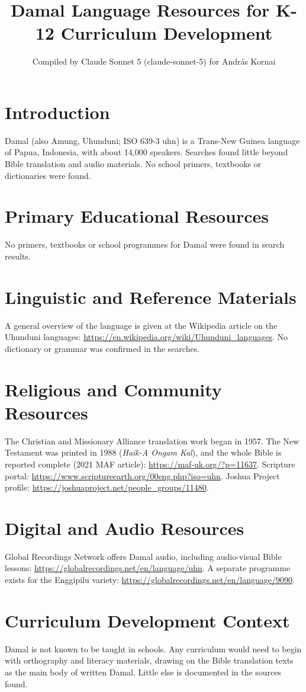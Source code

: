 \documentclass[12pt]{article}
\title{Damal Language Resources for K-12 Curriculum Development}
\author{Compiled by Claude Sonnet 5 (claude-sonnet-5) for Andr\'as Kornai}
\date{}
\begin{document}
\maketitle

\section{Introduction}
Damal (also Amung, Uhunduni; ISO 639-3 uhn) is a Trans-New Guinea language of Papua, Indonesia, with about 14,000 speakers. Searches found little beyond Bible translation and audio materials. No school primers, textbooks or dictionaries were found.

\section{Primary Educational Resources}
No primers, textbooks or school programmes for Damal were found in search results.

\section{Linguistic and Reference Materials}
A general overview of the language is given at the Wikipedia article on the Uhunduni languages: \url{https://en.wikipedia.org/wiki/Uhunduni_languages}. No dictionary or grammar was confirmed in the searches.

\section{Religious and Community Resources}
The Christian and Missionary Alliance translation work began in 1957. The New Testament was printed in 1988 (\emph{Haik-A Ongam Kal}), and the whole Bible is reported complete (2021 MAF article): \url{https://maf-uk.org/?p=11637}. Scripture portal: \url{https://www.scriptureearth.org/00eng.php?iso=uhn}. Joshua Project profile: \url{https://joshuaproject.net/people_groups/11480}.

\section{Digital and Audio Resources}
Global Recordings Network offers Damal audio, including audio-visual Bible lessons: \url{https://globalrecordings.net/en/language/uhn}. A separate programme exists for the Enggipilu variety: \url{https://globalrecordings.net/en/language/9090}.

\section{Curriculum Development Context}
Damal is not known to be taught in schools. Any curriculum would need to begin with orthography and literacy materials, drawing on the Bible translation texts as the main body of written Damal. Little else is documented in the sources found.
\end{document}
